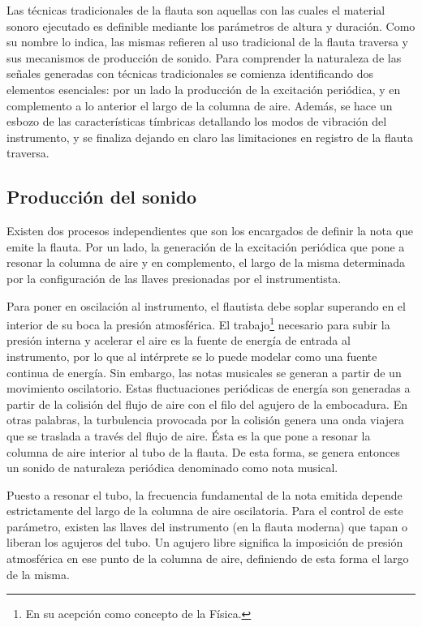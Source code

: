 \documentclass
  [ams,pdfout]%
	{aeslac}
\begin{document}
Las técnicas tradicionales de la flauta son aquellas con las cuales el material sonoro ejecutado es definible mediante los parámetros de altura y duración. Como su nombre lo indica, las mismas refieren al uso tradicional de la flauta traversa y sus mecanismos de producción de sonido. Para comprender la naturaleza de las señales generadas con técnicas tradicionales se comienza identificando dos elementos esenciales: por un lado la producción de la excitación periódica, y en complemento a lo anterior el largo de la columna de aire. Además, se hace un esbozo de las características tímbricas detallando los modos de vibración del instrumento, y se finaliza dejando en claro las limitaciones en registro de la flauta traversa. 

\subsection*{Producción del sonido}

Existen dos procesos independientes que son los encargados de definir la nota que emite la flauta. Por un lado, la generación de la excitación periódica que pone a resonar la columna de aire y en complemento, el largo de la misma determinada por la configuración de las llaves presionadas por el instrumentista. 

Para poner en oscilación al instrumento, el flautista debe soplar superando en el interior de su boca la presión atmosférica. El trabajo\footnote{En su acepción como concepto de la Física.} necesario para subir la presión interna y acelerar el aire es la fuente de energía de entrada al instrumento, por lo que al intérprete se lo puede modelar como una fuente continua de energía. Sin embargo, las notas musicales se generan a partir de un movimiento oscilatorio. Estas fluctuaciones periódicas de energía son generadas a partir de la colisión del flujo de aire con el filo del agujero de la embocadura. En otras palabras, la turbulencia provocada por la colisión genera una onda viajera que se traslada a través del flujo de aire. Ésta es la que pone a resonar la columna de aire interior al tubo de la flauta. De esta forma, se genera entonces un sonido de naturaleza periódica denominado como nota musical.

Puesto a resonar el tubo, la frecuencia fundamental de la nota emitida depende estrictamente del largo de la columna de aire oscilatoria. Para el control de este parámetro, existen las llaves del instrumento (en la flauta moderna) que tapan o liberan los agujeros del tubo. Un agujero libre significa la imposición de presión atmosférica en ese punto de la columna de aire, definiendo de esta forma el largo de la misma.
\end{document}
